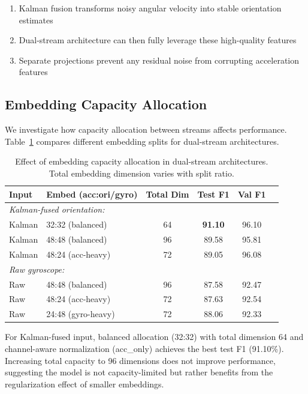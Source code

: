\begin{enumerate}
    \item Kalman fusion transforms noisy angular velocity into stable orientation estimates
    \item Dual-stream architecture can then fully leverage these high-quality features
    \item Separate projections prevent any residual noise from corrupting acceleration features
\end{enumerate}

\subsection{Embedding Capacity Allocation}
\label{subsec:embed_ablation}

We investigate how capacity allocation between streams affects performance. Table~\ref{tab:embed_ratio} compares different embedding splits for dual-stream architectures.

\begin{table}[H]
\caption{Effect of embedding capacity allocation in dual-stream architectures. Total embedding dimension varies with split ratio.}
\label{tab:embed_ratio}
\centering
\begin{tabular}{llcccc}
\toprule
\textbf{Input} & \textbf{Embed (acc:ori/gyro)} & \textbf{Total Dim} & \textbf{Test F1} & \textbf{Val F1} \\
\midrule
\multicolumn{5}{l}{\textit{Kalman-fused orientation:}} \\
Kalman & 32:32 (balanced) & 64 & \textbf{91.10} & 96.10 \\
Kalman & 48:48 (balanced) & 96 & 89.58 & 95.81 \\
Kalman & 48:24 (acc-heavy) & 72 & 89.05 & 96.08 \\
\midrule
\multicolumn{5}{l}{\textit{Raw gyroscope:}} \\
Raw & 48:48 (balanced) & 96 & 87.58 & 92.47 \\
Raw & 48:24 (acc-heavy) & 72 & 87.63 & 92.54 \\
Raw & 24:48 (gyro-heavy) & 72 & 88.06 & 92.33 \\
\bottomrule
\end{tabular}
\end{table}

For Kalman-fused input, balanced allocation (32:32) with total dimension 64 and channel-aware normalization (acc\_only) achieves the best test F1 (91.10\%). Increasing total capacity to 96 dimensions does not improve performance, suggesting the model is not capacity-limited but rather benefits from the regularization effect of smaller embeddings.

